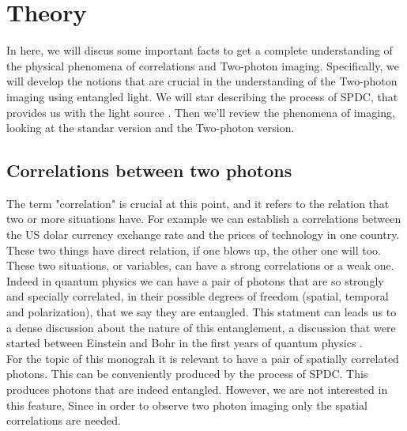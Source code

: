 
\chapter{Theory} %

\label{Chapter2} %

In here, we will discus some important facts to get a complete understanding 
of the physical phenomena of correlations and Two-photon imaging. Specifically, we will develop the 
notions that are crucial in the understanding of the Two-photon imaging using entangled light. We will
 star describing the process of SPDC, that provides us with the light source . Then we'll review the 
phenomena of imaging, looking at the standar version and the Two-photon version. 
\section{Correlations between two photons}

The term "correlation" is crucial at this point, and it refers to the relation that two or more situations have. For example 
we can establish a correlations between the US dolar currency exchange rate and the prices of technology in one country. These two things have direct relation, if one blows up, the other one will too.
These two situations, or variables, can have a strong correlations or a weak one. \\

Indeed in quantum physics we can have a pair of photons that are so strongly and specially correlated, in their possible degrees of freedom (spatial, temporal and polarization),
that we say they are entangled. This statment can leads us 
to a dense discussion about the nature of this entanglement, 
a discussion that were started between Einstein and Bohr in the first years of quantum physics \cite{einstein}.\\

For the topic  of this monograh it is relevant to have a pair of spatially correlated  photons. This can be conveniently produced
 by the process of SPDC. This produces photons that are indeed entangled. However, we are not interested in this feature, Since in order to observe 
 two photon imaging only the spatial correlations are needed.




